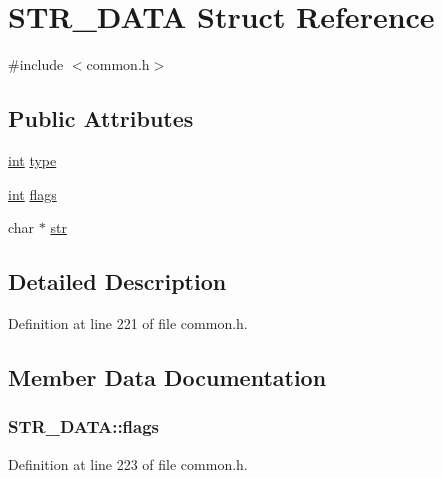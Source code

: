 \hypertarget{struct_s_t_r___d_a_t_a}{}\section{S\+T\+R\+\_\+\+D\+A\+TA Struct Reference}
\label{struct_s_t_r___d_a_t_a}


{\ttfamily \#include $<$common.\+h$>$}

\subsection*{Public Attributes}
\begin{DoxyCompactItemize}
\item 
\hyperlink{xmltok_8h_a5a0d4a5641ce434f1d23533f2b2e6653}{int} \hyperlink{struct_s_t_r___d_a_t_a_aefed1fdf91377f70241c10d70853cea1}{type}
\item 
\hyperlink{xmltok_8h_a5a0d4a5641ce434f1d23533f2b2e6653}{int} \hyperlink{struct_s_t_r___d_a_t_a_a237f195c946a2d378312baf6128c31db}{flags}
\item 
char $\ast$ \hyperlink{struct_s_t_r___d_a_t_a_a03863afa1eb7369641c60e233c56f986}{str}
\end{DoxyCompactItemize}


\subsection{Detailed Description}


Definition at line 221 of file common.\+h.



\subsection{Member Data Documentation}
\subsubsection[{\texorpdfstring{flags}{flags}}]{ S\+T\+R\+\_\+\+D\+A\+T\+A\+::flags}\hypertarget{struct_s_t_r___d_a_t_a_a237f195c946a2d378312baf6128c31db}{}\label{struct_s_t_r___d_a_t_a_a237f195c946a2d378312baf6128c31db}


Definition at line 223 of file common.\+h.

